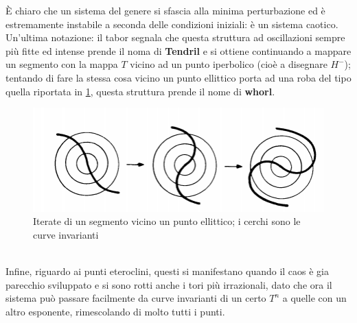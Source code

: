 \documentclass[a4paper,12pt]{article}
\theoremstyle{plain}
\theoremstyle{definition}
\theoremstyle{remark}
\begin{document}
È chiaro che un sistema del genere si sfascia alla minima perturbazione ed è estremamente instabile a seconda delle condizioni  iniziali: è un sistema caotico.
\\Un'ultima notazione: il tabor segnala che questa struttura ad oscillazioni sempre più fitte ed intense prende il noma di \textbf{Tendril} e si ottiene continuando a mappare un segmento con la mappa $T$ vicino ad  un punto iperbolico (cioè a disegnare $H^-$); tentando di fare la stessa cosa vicino un punto ellittico porta ad una roba del tipo quella riportata in \ref{whorl}, questa struttura prende il nome di \textbf{whorl}.
\begin{figure}[h]
	\centering
\includegraphics[scale=0.6]{whorl}\caption{Iterate di un segmento vicino un punto ellittico; i cerchi sono le curve invarianti}\label{whorl}\end{figure}
\\Infine, riguardo ai punti eteroclini, questi si manifestano quando il caos è gia parecchio sviluppato e si sono rotti anche i tori più irrazionali, dato che ora il sistema può passare facilmente da curve invarianti di un certo $T^n$ a quelle con un altro esponente, rimescolando di molto tutti i punti.
\end{document}

